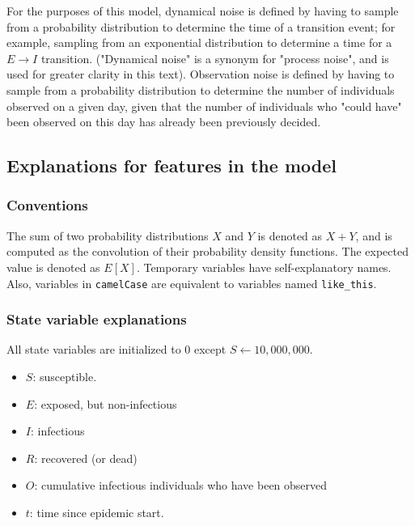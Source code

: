 \documentclass{article}
\newcommand{\code}[1]{\texttt{#1}}
\begin{document}
For the purposes of this model, dynamical noise is defined by having to sample from a probability distribution to determine the time of a transition event; for example, sampling from an exponential distribution to determine a time for a $E \rightarrow I$ transition. ("Dynamical noise" is a synonym for "process noise", and is used for greater clarity in this text). Observation noise is defined by having to sample from a probability distribution to determine the number of individuals observed on a given day, given that the number of individuals who "could have" been observed on this day has already been previously decided.

\subsection{Explanations for features in the model}

\subsubsection{Conventions}
The sum of two probability distributions $X$ and $Y$ is denoted as $X+Y$, and is computed as the convolution of their probability density functions. The expected value is denoted as $E[X]$. Temporary variables have self-explanatory names. Also, variables in \code{camelCase} are equivalent to variables named \code{like\_this}. 


\subsubsection{State variable explanations}
All state variables are initialized to 0 except $S \gets 10,000,000$. 

\begin{itemize}
    \item $S$: susceptible.
    \item $E$: exposed, but non-infectious
    \item $I$: infectious
    \item $R$: recovered (or dead)
    \item $O$: cumulative infectious individuals who have been observed 
    \item $t$: time since epidemic start.
\end{itemize}
\end{document}
